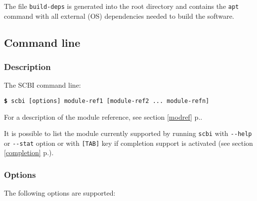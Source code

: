 \documentclass[a4paper,12pt,twoside]{article}
\newcommand{\code}[1]{\texttt{#1}}
\newcommand{\seeref}[1]{see section \ref{#1} p.\pageref{#1}}
\newcommand{\cmd}[1]{\tabto{1cm}\hspace{0.5cm}\texttt{\textbf{\$} #1}}
\newcommand{\ddash}{-{}-}
\begin{document}
The file \code{build-deps} is generated into the root directory and contains the \code{apt} command with all external (OS) dependencies needed to build the software.

\subsection{Command line}

\subsubsection{Description}

The SCBI command line:

\cmd{scbi [options] module-ref1 [module-ref2 ... module-refn]}

For a description of the module reference, \seeref{modref}.

It is possible to list the module currently supported by running \code{scbi} with \code{\ddash{}help} or \code{\ddash{}stat} option or with \code{[TAB]} key if completion support is activated (\seeref{completion}).

\subsubsection{Options}
\label{cmdline}

The following options are supported:
\end{document}
